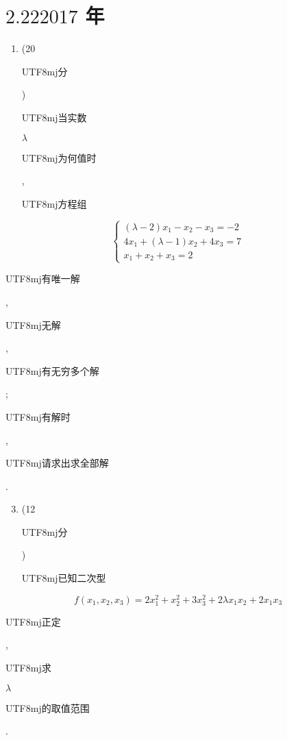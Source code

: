 \documentclass[10pt]{article}
\begin{document}
\section{$2.222017$ 年}
\begin{enumerate}
  \item (20 \begin{CJK}{UTF8}{mj}分\end{CJK}) \begin{CJK}{UTF8}{mj}当实数\end{CJK} $\lambda$ \begin{CJK}{UTF8}{mj}为何值时\end{CJK}, \begin{CJK}{UTF8}{mj}方程组\end{CJK}
\end{enumerate}
$$
\left\{\begin{array}{l}
(\lambda-2) x_{1}-x_{2}-x_{3}=-2 \\
4 x_{1}+(\lambda-1) x_{2}+4 x_{3}=7 \\
x_{1}+x_{2}+x_{3}=2
\end{array}\right.
$$
\begin{CJK}{UTF8}{mj}有唯一解\end{CJK}, \begin{CJK}{UTF8}{mj}无解\end{CJK}, \begin{CJK}{UTF8}{mj}有无穷多个解\end{CJK}; \begin{CJK}{UTF8}{mj}有解时\end{CJK}, \begin{CJK}{UTF8}{mj}请求出求全部解\end{CJK}.

\begin{enumerate}
  \setcounter{enumi}{2}
  \item (12 \begin{CJK}{UTF8}{mj}分\end{CJK}) \begin{CJK}{UTF8}{mj}已知二次型\end{CJK}
\end{enumerate}
$$
f\left(x_{1}, x_{2}, x_{3}\right)=2 x_{1}^{2}+x_{2}^{2}+3 x_{3}^{2}+2 \lambda x_{1} x_{2}+2 x_{1} x_{3}
$$
\begin{CJK}{UTF8}{mj}正定\end{CJK}, \begin{CJK}{UTF8}{mj}求\end{CJK} $\lambda$ \begin{CJK}{UTF8}{mj}的取值范围\end{CJK}.
\end{document}
